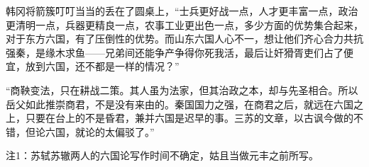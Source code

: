 韩冈将箭簇叮叮当当的丢在了圆桌上，“士兵更好战一点，人才更丰富一点，政治更清明一点，兵器更精良一点，农事工业更出色一点，多少方面的优势集合起来，对于东方六国，有了压倒性的优势。而山东六国人心不一，想让他们齐心合力共抗强秦，是缘木求鱼——兄弟间还能争产争得你死我活，最后让奸猾胥吏们占了便宜，放到六国，还不都是一样的情况？”

“商鞅变法，只在耕战二策。其人虽为法家，但其治政之本，却与先圣相合。所以岳父如此推崇商君，不是没有来由的。秦国国力之强，在商君之后，就远在六国之上，只要在台上的不是昏君，兼并六国是迟早的事。三苏的文章，以古讽今做的不错，但论六国，就论的太偏驳了。”

注1：苏轼苏辙两人的六国论写作时间不确定，姑且当做元丰之前所写。

